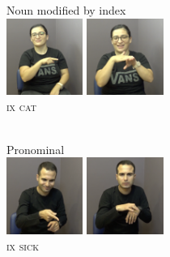 \documentclass[
  english,
  doc,mask]{apa6}
\begin{document}
\begin{multicols}{2}
\begin{exe}
\begin{xlist}
\ex Noun modified by index\\\glll 
\includegraphics[width=2.5cm]{pictures/1d_1.png} \includegraphics[width=2.5cm]{pictures/1d_2.png}\\ \textsc{ix} \textsc{cat} \\ \\
\end{xlist}
\end{exe}
\end{multicols}
\vspace{-1.25cm}
\newpage
\ea 
\ea Pronominal \\\glll
\includegraphics[width=2.5cm]{pictures/2_1.png} \includegraphics[width=2.5cm]{pictures/2_2.png} \\ \textsc{ix} \textsc{sick} \\ \\
\z \z
\vspace{-0.75cm}
\end{document}
